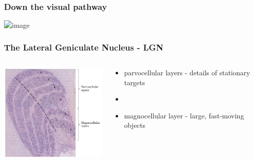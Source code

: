 \documentclass[]{beamer}
\begin{document}
\begin{frame}
 \frametitle{Down the visual pathway}
\begin{center}
\includegraphics<1>[width=80mm]{figs/l3/cortical_pathways2.png}
\end{center}
\end{frame}



\begin{frame}
 \frametitle{The Lateral Geniculate Nucleus - LGN}
\begin{overlayarea}{113mm}{69mm}
\begin{columns}[T]
 \begin{column}{50mm}
\includegraphics[width=60mm]{figs/l3/lgn_layers.png}
 \end{column}

 \begin{column}{60mm}
\begin{itemize}
 \setlength{\itemsep}{5pt}
 \item parvocellular layers - details of stationary targets
 \item[]
 \item magnocellular layer - large, fast-moving objects
\end{itemize}
 \end{column}
\end{columns}
\end{overlayarea}
\end{frame}
\end{document}
